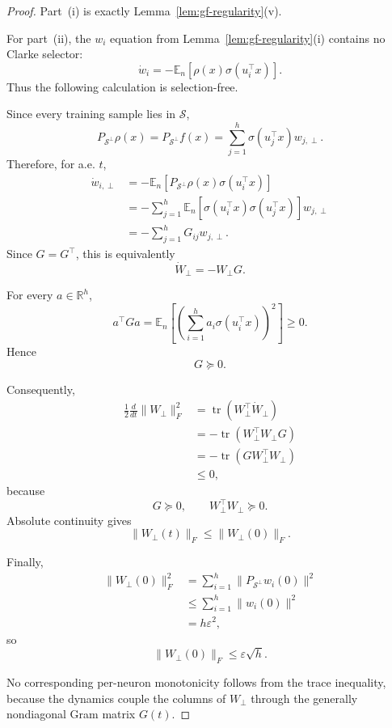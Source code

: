 \documentclass{article} %
\theoremstyle{plain}
\theoremstyle{definition}
\theoremstyle{remark}
\begin{document}
\begin{proof}
Part~\textnormal{(i)} is exactly
Lemma~\ref{lem:gf-regularity}\textnormal{(v)}.

For part~\textnormal{(ii)}, the $w_i$ equation from
Lemma~\ref{lem:gf-regularity}\textnormal{(i)} contains no Clarke selector:
\[
\dot w_i
=
-
\mathbb E_n
\left[
\rho(x)
\sigma(u_i^\top x)
\right].
\]
Thus the following calculation is selection-free.

Since every training sample lies in $\mathcal S$,
\[
P_{\mathcal S^\perp}\rho(x)
=
P_{\mathcal S^\perp}f(x)
=
\sum_{j=1}^h
\sigma(u_j^\top x)
w_{j,\perp}.
\]
Therefore, for a.e. $t$,
\[
\begin{aligned}
\dot w_{i,\perp}
&=
-
\mathbb E_n
\left[
P_{\mathcal S^\perp}\rho(x)
\sigma(u_i^\top x)
\right]
\\
&=
-
\sum_{j=1}^h
\mathbb E_n
\left[
\sigma(u_i^\top x)
\sigma(u_j^\top x)
\right]
w_{j,\perp}
\\
&=
-
\sum_{j=1}^h
G_{ij}w_{j,\perp}.
\end{aligned}
\]
Since $G=G^\top$, this is equivalently
\[
\dot W_\perp
=
-W_\perp G.
\]

For every $a\in\mathbb R^h$,
\[
a^\top G a
=
\mathbb E_n
\left[
\left(
\sum_{i=1}^h
a_i
\sigma(u_i^\top x)
\right)^2
\right]
\ge0.
\]
Hence
\[
G\succeq0.
\]

Consequently,
\[
\begin{aligned}
\frac12
\frac{d}{dt}
\|W_\perp\|_F^2
&=
\operatorname{tr}
\left(
W_\perp^\top
\dot W_\perp
\right)
\\
&=
-
\operatorname{tr}
\left(
W_\perp^\top
W_\perp
G
\right)
\\
&=
-
\operatorname{tr}
\left(
G
W_\perp^\top
W_\perp
\right)
\\
&\le0,
\end{aligned}
\]
because
\[
G\succeq0,
\qquad
W_\perp^\top W_\perp\succeq0.
\]
Absolute continuity gives
\[
\|W_\perp(t)\|_F
\le
\|W_\perp(0)\|_F.
\]

Finally,
\[
\begin{aligned}
\|W_\perp(0)\|_F^2
&=
\sum_{i=1}^h
\|P_{\mathcal S^\perp}w_i(0)\|^2
\\
&\le
\sum_{i=1}^h
\|w_i(0)\|^2
\\
&=
h\varepsilon^2,
\end{aligned}
\]
so
\[
\|W_\perp(0)\|_F
\le
\varepsilon\sqrt h.
\]

No corresponding per-neuron monotonicity follows from the trace inequality,
because the dynamics couple the columns of $W_\perp$ through the generally
nondiagonal Gram matrix $G(t)$.
\end{proof}
\end{document}
